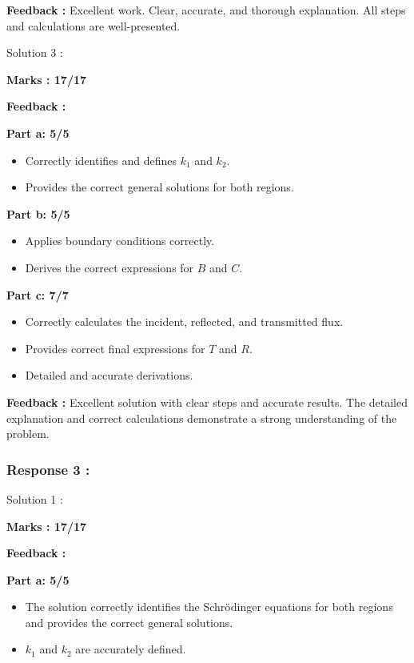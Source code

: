 \documentclass[a4paper,11pt]{article}
\begin{document}
\textbf{Feedback :}
Excellent work. Clear, accurate, and thorough explanation. All steps and calculations are well-presented.


Solution 3 :

\textbf{Marks : 17/17}

\textbf{Feedback :}

\textbf{Part a: 5/5}
\begin{itemize}
    \item Correctly identifies and defines $k_1$ and $k_2$.
    \item Provides the correct general solutions for both regions.
\end{itemize}


\textbf{Part b: 5/5}
\begin{itemize}
    \item Applies boundary conditions correctly.
    \item Derives the correct expressions for $B$ and $C$.
\end{itemize}

\textbf{Part c: 7/7}
\begin{itemize}
    \item Correctly calculates the incident, reflected, and transmitted flux.
    \item Provides correct final expressions for $T$ and $R$.
    \item Detailed and accurate derivations.
\end{itemize}



\textbf{Feedback :}
Excellent solution with clear steps and accurate results. The detailed explanation and correct calculations demonstrate a strong understanding of the problem.


\subsubsection*{Response 3 :}


Solution 1 : 

\textbf{Marks : 17/17}

\textbf{Feedback :}

\textbf{Part a: 5/5}
\begin{itemize}
    \item The solution correctly identifies the Schrödinger equations for both regions and provides the correct general solutions.
    \item $k_1$ and $k_2$ are accurately defined.
\end{itemize}
\end{document}
